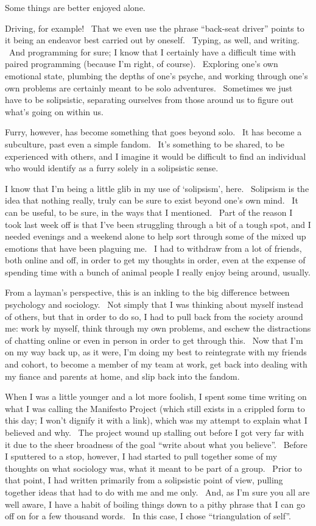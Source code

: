 Some things are better enjoyed alone.

Driving, for example! ~That we even use the phrase ``back-seat driver''
points to it being an endeavor best carried out by oneself. ~Typing, as
well, and writing. ~And programming for sure; I know that I certainly
have a difficult time with paired programming (because I'm right, of
course). ~Exploring one's own emotional state, plumbing the depths of
one's psyche, and working through one's own problems are certainly meant
to be solo adventures. ~Sometimes we just have to be solipsistic,
separating ourselves from those around us to figure out what's going on
within us.

Furry, however, has become something that goes beyond solo. ~It has
become a subculture, past even a simple fandom. ~It's something to be
shared, to be experienced with others, and I imagine it would be
difficult to find an individual who would identify as a furry solely in
a solipsistic sense.

I know that I'm being a little glib in my use of `solipsism', here.
~Solipsism is the idea that nothing really, truly can be sure to exist
beyond one's own mind. ~It can be useful, to be sure, in the ways that I
mentioned. ~Part of the reason I took last week off is that I've been
struggling through a bit of a tough spot, and I needed evenings and a
weekend alone to help sort through some of the mixed up emotions that
have been plaguing me. ~I had to withdraw from a lot of friends, both
online and off, in order to get my thoughts in order, even at the
expense of spending time with a bunch of animal people I really enjoy
being around, usually.

From a layman's perspective, this is an inkling to the big difference
between psychology and sociology. ~Not simply that I was thinking about
myself instead of others, but that in order to do so, I had to pull back
from the society around me: work by myself, think through my own
problems, and eschew the distractions of chatting online or even in
person in order to get through this. ~Now that I'm on my way back up, as
it were, I'm doing my best to reintegrate with my friends and cohort, to
become a member of my team at work, get back into dealing with my fiance
and parents at home, and slip back into the fandom.

When I was a little younger and a lot more foolish, I spent some time
writing on what I was calling the Manifesto Project (which still exists
in a crippled form to this day; I won't dignify it with a link), which
was my attempt to explain what I believed and why. ~The project wound up
stalling out before I got very far with it due to the sheer broadness of
the goal ``write about what you believe''. ~Before I sputtered to a
stop, however, I had started to pull together some of my thoughts on
what sociology was, what it meant to be part of a group. ~Prior to that
point, I had written primarily from a solipsistic point of view, pulling
together ideas that had to do with me and me only. ~And, as I'm sure you
all are well aware, I have a habit of boiling things down to a pithy
phrase that I can go off on for a few thousand words. ~In this case, I
chose ``triangulation of self''.

